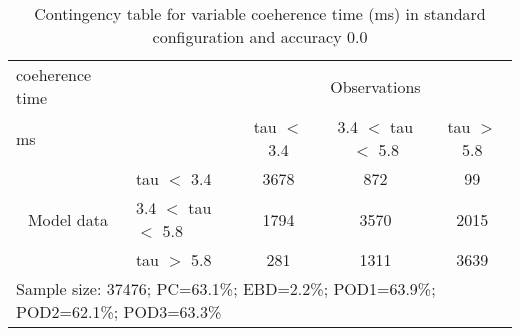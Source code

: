 \begin{table}[]
\begin{center}
\begin{tabular}{llccc}
\hline
{coeherence time}                                       &                                                    & \multicolumn{3}{c}{Observations}                 \\
{ms}                                       &                             & tau $<$ 3.4   & 3.4 $<$ tau $<$ 5.8 & tau $>$ 5.8 \\
\hline
\multicolumn{1}{c}{\multirow{3}{*}{Model data}}  & tau $<$ 3.4             & 3678                & 872                       & 99              \\
                                                 & 3.4  $<$ tau $<$ 5.8 & 1794                & 3570                       & 2015              \\
                                                 & tau $>$ 5.8             & 281                & 1311                       & 3639              \\
\hline
\multicolumn{5}{l}{Sample size: 37476; PC=63.1\%; EBD=2.2\%; POD1=63.9\%; POD2=62.1\%; POD3=63.3\%}
\end{tabular}
\end{center}
\caption{Contingency table for variable coeherence time (ms) in standard configuration and accuracy 0.0}
\label{tab:contingencytauBEF}
\end{table}
